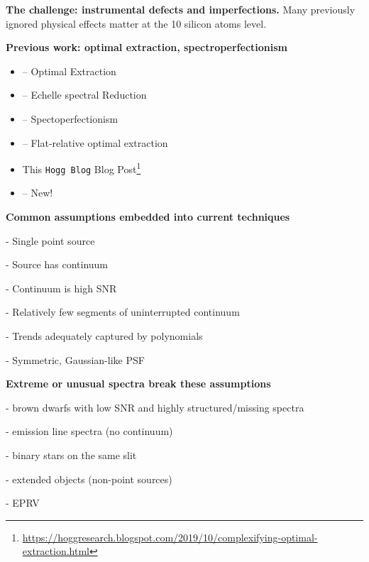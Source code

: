 \documentclass[twocolumn]{aastex63}
\begin{document}
\textbf{The challenge: instrumental defects and imperfections.}
Many previously ignored physical effects matter at the 10 silicon atoms level.



\begin{mdframed}
  \textbf{Previous work: optimal extraction, spectroperfectionism} \par
  \textcolor{lightgray}{\lipsum[3]}
\end{mdframed}

\begin{itemize}
  \item \citet{1986PASP...98..609H}-- Optimal Extraction
  \item \citet{2002A&A...385.1095P}-- Echelle spectral Reduction
  \item \citet{2010PASP..122..248B}-- Spectoperfectionism
  \item \citet{2014A&A...561A..59Z}-- Flat-relative optimal extraction
  \item This \texttt{Hogg Blog} Blog Post\footnote{\url{https://hoggresearch.blogspot.com/2019/10/complexifying-optimal-extraction.html}}
  \item \citet{2020arXiv200805827P}-- New!
\end{itemize}


\begin{mdframed}
  \textbf{Common assumptions embedded into current techniques} \par
  - Single point source\par
  - Source has continuum\par
  - Continuum is high SNR\par
  - Relatively few segments of uninterrupted continuum\par
  - Trends adequately captured by polynomials\par
  - Symmetric, Gaussian-like PSF\par
\end{mdframed}

\begin{mdframed}
  \textbf{Extreme or unusual spectra break these assumptions} \par
  - brown dwarfs with low SNR and highly structured/missing spectra\par
  - emission line spectra (no continuum)\par
  - binary stars on the same slit\par
  - extended objects (non-point sources)\par
  - EPRV\par
\end{mdframed}
\end{document}
